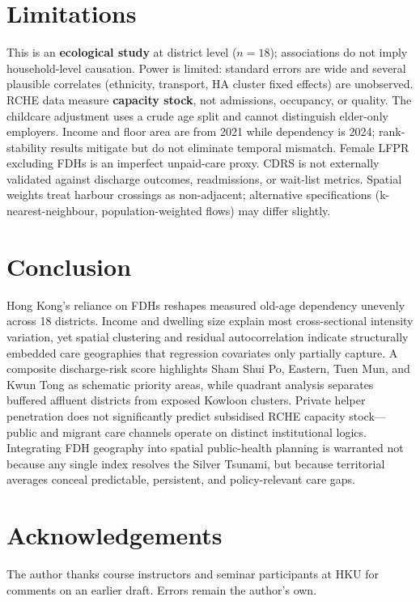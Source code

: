 \documentclass[11pt,a4paper]{article}
\begin{document}
\section{Limitations}

This is an \textbf{ecological study} at district level ($n{=}18$); associations do not imply household-level causation. Power is limited: standard errors are wide and several plausible correlates (ethnicity, transport, HA cluster fixed effects) are unobserved. RCHE data measure \textbf{capacity stock}, not admissions, occupancy, or quality. The childcare adjustment uses a crude age split and cannot distinguish elder-only employers. Income and floor area are from 2021 while dependency is 2024; rank-stability results mitigate but do not eliminate temporal mismatch. Female LFPR excluding FDHs is an imperfect unpaid-care proxy. CDRS is not externally validated against discharge outcomes, readmissions, or wait-list metrics. Spatial weights treat harbour crossings as non-adjacent; alternative specifications (k-nearest-neighbour, population-weighted flows) may differ slightly.

\section{Conclusion}

Hong Kong's reliance on FDHs reshapes measured old-age dependency unevenly across 18 districts. Income and dwelling size explain most cross-sectional intensity variation, yet spatial clustering and residual autocorrelation indicate structurally embedded care geographies that regression covariates only partially capture. A composite discharge-risk score highlights Sham Shui Po, Eastern, Tuen Mun, and Kwun Tong as schematic priority areas, while quadrant analysis separates buffered affluent districts from exposed Kowloon clusters. Private helper penetration does not significantly predict subsidised RCHE capacity stock---public and migrant care channels operate on distinct institutional logics. Integrating FDH geography into spatial public-health planning is warranted not because any single index resolves the Silver Tsunami, but because territorial averages conceal predictable, persistent, and policy-relevant care gaps.

\section*{Acknowledgements}
The author thanks course instructors and seminar participants at HKU for comments on an earlier draft. Errors remain the author's own.
\end{document}
